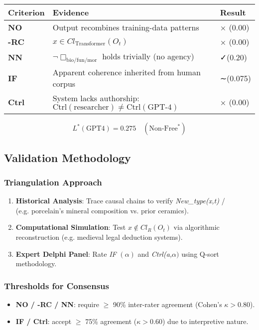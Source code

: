 \documentclass[11pt,a4paper]{article}
\begin{document}
\begin{tabular}{l l l}
Criterion & Evidence & Result \\
\hline
\textbf{NO} & Output recombines training-data patterns \cite[ p. 77]{floridi2024} & × (0.00) \\
\textbf{-RC} & \(x \in Cl_{\text{Transformer}}(O_t)\) \cite[ p. 219]{greene2021} & × (0.00) \\
\textbf{NN} & \(\neg\Box_{\text{bio/fun/mor}}\) holds trivially (no agency) & ✓(0.20) \\
\textbf{IF} & Apparent coherence inherited from human corpus \cite[ p. 55]{coeckelbergh2023} & ∼(0.075) \\
\textbf{Ctrl} & System lacks authorship: \(\text{Ctrl}(\text{researcher}) \neq \text{Ctrl}(\text{GPT-4})\) & × (0.00) \\
\end{tabular}

\[
L^{*}(\text{GPT4}) = 0.275 \quad (\text{Non-Free}^{*})
\]

\subsection{Validation Methodology}\label{sec:methods-validation}

\subsubsection{Triangulation Approach}

\begin{enumerate}
  \item \textbf{Historical Analysis}: Trace causal chains to verify \emph{New_type(x,t)} /\\ (e.g. porcelain's mineral composition vs. prior ceramics).
  \item \textbf{Computational Simulation}: Test \(x\notin Cl_{R}(O_{t})\) via algorithmic reconstruction (e.g. medieval legal deduction systems).
  \item \textbf{Expert Delphi Panel}: Rate \emph{IF} \((\alpha)\) and \emph{Ctrl(a,\(\alpha)\)} using Q-sort methodology.
\end{enumerate}

\subsubsection{Thresholds for Consensus}

\begin{itemize}
  \item \textbf{NO / -RC / NN}: require \(\geq\) 90\% inter-rater agreement (Cohen's \(\kappa>0.80\)).
  \item \textbf{IF / Ctrl}: accept \(\geq\) 75\% agreement (\(\kappa>0.60\)) due to interpretive nature.
\end{itemize}
\end{document}
